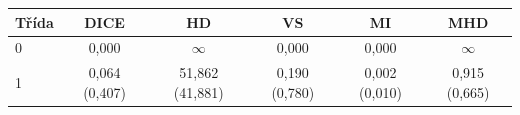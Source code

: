 \begin{tabular}{l c c c c c}
 \hline
Třída & DICE & HD & VS & MI & MHD \\ \hline
0 & 0,000 & $\infty$ & 0,000 & 0,000 & $\infty$ \\
1 & 0,064 (0,407) & 51,862 (41,881) & 0,190 (0,780) & 0,002 (0,010) & 0,915 (0,665) \\
\hline 
 \end{tabular}
